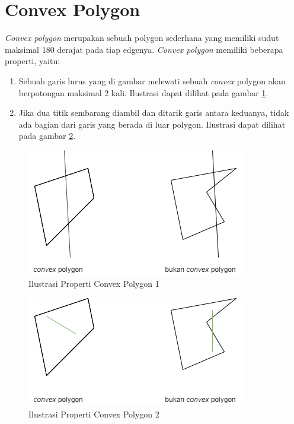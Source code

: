 \section{Convex Polygon}
\textit{Convex polygon} merupakan sebuah polygon sederhana yang memiliki sudut maksimal 180 derajat pada tiap edgenya. \textit{Convex polygon} memiliki beberapa properti, yaitu:
\begin{enumerate}
    \item Sebuah garis lurus yang di gambar melewati sebuah \textit{convex} polygon akan berpotongan maksimal 2 kali. Ilustrasi dapat dilihat pada gambar \ref{fig:ilustrasi-properti-convex-polygon-1}.
    \item Jika dua titik sembarang diambil dan ditarik garis antara keduanya, tidak ada bagian dari garis yang berada di luar polygon. Ilustrasi dapat dilihat pada gambar \ref{fig:ilustrasi-properti-convex-polygon-2}.
\end{enumerate}
\begin{figure}[!h]
    \Centering
    \includegraphics[width=0.5\columnwidth]{bab2/img/ilustrasi-properti-convex-polygon-1}
    \caption{Ilustrasi Properti Convex Polygon 1}
    \label{fig:ilustrasi-properti-convex-polygon-1}
\end{figure}
\begin{figure}[!h]
    \Centering
    \includegraphics[width=0.5\columnwidth]{bab2/img/ilustrasi-properti-convex-polygon-2}
    \caption{Ilustrasi Properti Convex Polygon 2}
    \label{fig:ilustrasi-properti-convex-polygon-2}
\end{figure}


